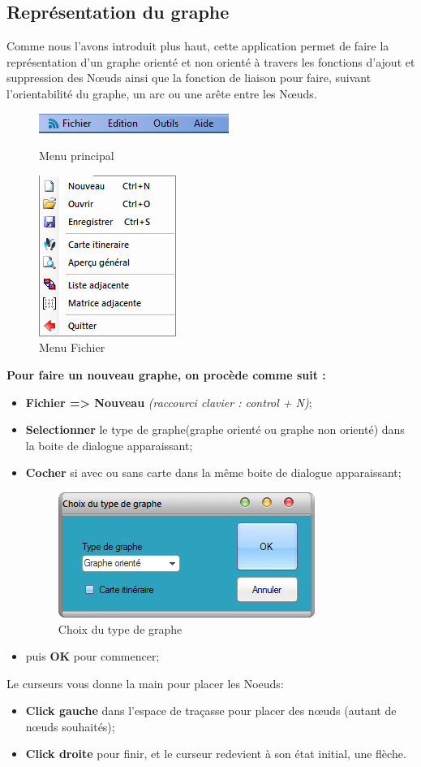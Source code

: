 \documentclass[11pt,twoside,a4paper]{article}
\begin{document}
\subsection{Représentation du graphe}
Comme nous l’avons introduit plus haut, cette application permet de faire la représentation d'un graphe orienté et non orienté à travers les fonctions d’ajout et suppression des Nœuds ainsi que la fonction de liaison pour faire, suivant l’orientabilité du graphe, un arc ou une arête entre les Nœuds.
\begin{figure}[!h]
\begin{center}
\includegraphics{menu.png}
\caption{Menu principal}
\includegraphics{fichier.png}
\caption{Menu Fichier}
\end{center}
\end{figure}
{\bf Pour faire un nouveau graphe, on procède comme suit :} 
\begin{itemize}
  	 \item \textbf{Fichier => Nouveau} \textit{ (raccourci clavier : control + N)};
	\item \textbf{Selectionner} le type de graphe(graphe orienté ou graphe non orienté) dans la boite de dialogue apparaissant;
	\item \textbf{Cocher} si avec ou sans carte dans la même boite de dialogue apparaissant;
\begin{figure}[!h]
\begin{center}
\includegraphics{choix.png}
\caption{Choix du type de graphe}
\end{center}
\end{figure}
	\item puis \textbf{OK} pour commencer;
\end{itemize}
Le curseurs vous donne la main pour  placer les Noeuds:
\begin{itemize}
	\item \textbf{Click gauche} dans l’espace de traçasse pour placer des nœuds (autant de nœuds souhaités);
	\item \textbf{Click droite} pour finir, et le curseur redevient à son état initial, une flèche.
\end{itemize}
\end{document}
